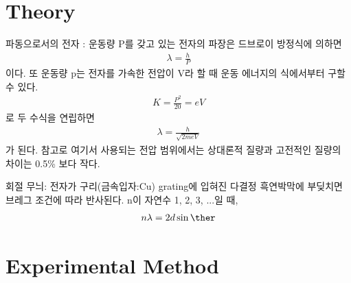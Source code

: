 \documentclass[a4paper, 10pt, nanum]{CSUniSchoolLabReport}
\begin{document}

\section{Theory}


	파동으로서의 전자 : 운동량 P를 갖고 있는 전자의 파장은 드브로이 방정식에 의하면
	\begin{align}
		\lambda = \frac{h}{P}
	\end{align}
	이다. 또 운동량 p는 전자를 가속한 전압이 V라 할 때 운동 에너지의 식에서부터 구할 수 있다.
	\begin{align}
		K = \frac{P^2}{20} = eV
	\end{align}
	로 두 수식을 연립하면
	\begin{align}
		\lambda = \frac{h}{\sqrt{2meV}}
	\end{align}
	가 된다. 참고로 여기서 사용되는 전압 범위에서는 상대론적 질량과 고전적인 질량의 차이는 0.5\% 보다 작다.

	회절 무늬: 전자가 구리(금속입자:Cu) grating에 입혀진 다결정 흑연박막에 부딪치면 브레그 조건에 따라 반사된다. n이 자연수 1, 2, 3, ...일 때,
	\begin{align}
		n\lambda = 2d \sin\ther
	\end{align}



\section{Experimental Method}
\end{document}
